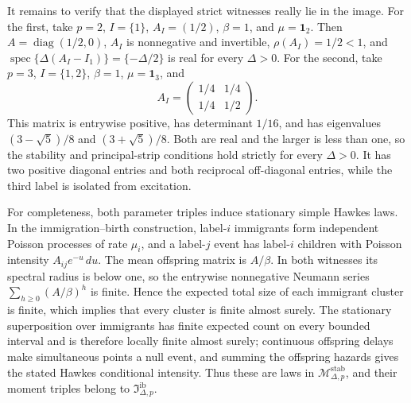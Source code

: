 It remains to verify that the displayed strict witnesses really lie in the image.  For the first, take \(p=2\), \(I=\{1\}\), \(A_I=(1/2)\), \(\beta=1\), and \(\mu=\mathbf1_2\).  Then \(A=\operatorname{diag}(1/2,0)\), \(A_I\) is nonnegative and invertible, \(\rho(A_I)=1/2<1\), and \(\operatorname{spec}\{\Delta(A_I-I_1)\}=\{-\Delta/2\}\) is real for every \(\Delta>0\).  For the second, take \(p=3\), \(I=\{1,2\}\), \(\beta=1\), \(\mu=\mathbf1_3\), and
\[
 A_I=\begin{pmatrix}1/4&1/4\\1/4&1/2\end{pmatrix}.
\tag{18}
\]
This matrix is entrywise positive, has determinant \(1/16\), and has eigenvalues \((3-\sqrt5)/8\) and \((3+\sqrt5)/8\).  Both are real and the larger is less than one, so the stability and principal-strip conditions hold strictly for every \(\Delta>0\).  It has two positive diagonal entries and both reciprocal off-diagonal entries, while the third label is isolated from excitation.

For completeness, both parameter triples induce stationary simple Hawkes laws.  In the immigration--birth construction, label-\(i\) immigrants form independent Poisson processes of rate \(\mu_i\), and a label-\(j\) event has label-\(i\) children with Poisson intensity \(A_{ij}e^{-u}\,du\).  The mean offspring matrix is \(A/\beta\).  In both witnesses its spectral radius is below one, so the entrywise nonnegative Neumann series \(\sum_{h\geq0}(A/\beta)^h\) is finite.  Hence the expected total size of each immigrant cluster is finite, which implies that every cluster is finite almost surely.  The stationary superposition over immigrants has finite expected count on every bounded interval and is therefore locally finite almost surely; continuous offspring delays make simultaneous points a null event, and summing the offspring hazards gives the stated Hawkes conditional intensity.  Thus these are laws in \(\mathcal M_{\Delta,p}^{\mathrm{stab}}\), and their moment triples belong to \(\mathfrak I_{\Delta,p}^{\mathrm{ib}}\).